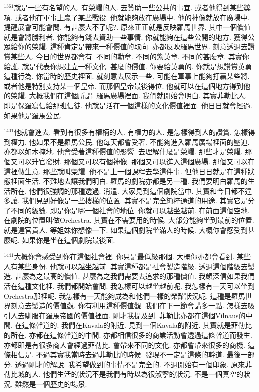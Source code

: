 \documentclass{book}
\begin{document}
$^{1361}$就是一些有名望的人.
有榮耀的人.
去贊助一些公共的事宜.
或者他得到某些獎項.
或者他在軍事上贏了某些戰役.
他就能夠放在廣場中.
他的神像就放在廣場中.
提醒展會可能會問.
有甚麼大不了呢?.
原來正正就是反映羅馬世界.
其中一個價值就是會將勝利者.
你能夠有錢去資助一些事情.
你就能夠在這些公開的地方.
獲得公眾給你的榮耀.
這種肯定是帶來一種價值的取向.
亦都反映羅馬世界.
刻意透過去讚賞某些人.
今日的世界都會有.
不同的勳章.
不同的紫英章.
不同的甚麼章.
其實你給誰.
就是代表你想建立一種文化.
甚麼的價值.
你要給英勇的.
你就是想讚賞英勇這種行為.
你當時的歷史裡面.
就刻意去展示一些.
可能在軍事上能夠打贏某些將.
或者他是特別支持某一個皇帝.
而那個皇帝最後得位.
他就可以在這個地方得到他的榮耀.
大概我們在這個所謂.
羅馬廣場裡面.
我們就開始會明白.
其實菲勒比人.
即是保羅寫信給那班信徒.
他就是活在一個這樣的文化價值裡面.
他日日就會經過.
如果他是羅馬公民.

$^{1401}$他就會進去.
看到有很多有權柄的人.
有權力的人.
是怎樣得到人的讚賞.
怎樣得到權力.
他如果不是羅馬公民.
他每天都會受著.
不能夠進入羅馬廣場裡面的壓迫.
亦都以如木掩地.
他會受著這種價值的影響.
去理解什麼是榮耀.
那些才是榮耀.
那個又可以升官發財.
那個又可以有個神像.
那個又可以進入這個廣場.
那個又可以在這裡做生意.
那些就叫榮耀.
他不是上一個課程去學這件事.
但他日日就是在這種狀態裡面生活.
不難地去讓我們明白.
羅馬的劇院亦都是另一種.
我們要明白羅馬的生活所在.
他們很強調的那種透過.
消遣.
大家見到這個劇院當中.
其實和今日都不遑多讓.
我們見到好像是一些樓梯的位置.
其實不是完全純粹通道的用途.
其實它是分了不同的級數.
即是你是哪一個社會的地位.
你就可以越坐越前.
在前面這個空地.
在劇院的位置叫做Orchestra.
其實在不需要用的時候.
大部分能夠坐到最前的位置.
就是達官貴人.
等姐妹你想像一下.
如果這個劇院坐滿人的時候.
大概你會感受到甚麼呢.
如果你是坐在這個劇院最後面.

$^{1441}$大概你會感受到你在這個社會裡.
你只是最低級那個.
大概你亦都會看到.
某些人有某些身份.
他就可以越坐越前.
其實這種都是社會製造階級.
透過這個階級去製造.
甚麼為之最高的價值.
甚麼為之我們需要去追求的那種價值.
我頗深信如果我們活在這種文化裡.
我們都開始會問.
我怎樣可以越坐越前呢.
我怎樣有一天可以坐到Orchestra那裡呢.
我怎樣有一天能夠成為和他們一樣的榮耀狀況呢.
這種是羅馬世界刻意去製造的價值觀.
你有利用這種價值觀.
我們在下一節會講多一點.
怎樣去吸引人去馴服在羅馬帝國的價值裡面.
剛才我提及到.
菲勒比亦都在這個Vilnaus的中間.
在這條幹道的.
我們在Kavala的附近.
見到一個Kavala的附近.
其實就是菲勒比的所在.
亦都在這條幹道的中間.
亦都相信很多的商業活動會透過這條幹道而發生.
亦都即是有很多商人會經過菲勒比.
會帶來不同的文化.
亦都會帶來很多的商機.
這條相信是.
不過其實我當時去過菲勒比的時候.
發現不一定是這條的幹道.
最後一部分.
透過剛才的解說.
我希望做到的事情不是完全的.
不過開始有一個印象.
原來菲勒比城的人.
他們生活的狀況不是我們有時以為很淑寧的狀況.
不是一個真空的狀況.
雖然是一個歷史的場景.
\end{document}

